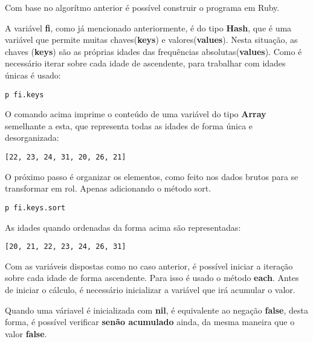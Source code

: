 \documentclass[12pt]{article}
\newcommand{\code}[1] {\textbf{#1}}
\begin{document}
Com base no algorítmo anterior é possível construir o programa em Ruby. 

 

A variável \code{fi}, como já mencionado anteriormente, é do tipo \code{Hash}, que é uma variável que permite muitas chaves(\code{keys}) e valores(\code{values}). Nesta situação, as chaves (\code{keys}) são as próprias idades das frequências absolutas(\code{values}). Como é necessário iterar sobre cada idade de ascendente, para trabalhar com idades únicas é usado:

\begin{lstlisting}[caption=Inspecionando apenas as idades das frequências absolutas]
  p fi.keys
\end{lstlisting}

O comando acima imprime o conteúdo de uma variável do tipo \code{Array} semelhante a esta, que representa todas as idades de forma única e desorganizada:

\begin{lstlisting}[caption=Idades das frequências absolutas podem ser usadas com o método de acesso]
[22, 23, 24, 31, 20, 26, 21]
\end{lstlisting}

O próximo passo é organizar os elementos, como feito nos dados brutos para se transformar em rol. Apenas adicionando o método sort.

\begin{lstlisting}[caption=Ordenando as idades das frequências absolutas com o método \code{sort}]
  p fi.keys.sort
\end{lstlisting}

As idades quando ordenadas da forma acima são representadas:

\begin{lstlisting}[caption=Idades das frequências absolutas ordenadas pelo método \code{sort}]
[20, 21, 22, 23, 24, 26, 31]
\end{lstlisting}

Com as variáveis dispostas como no caso anterior, é possível iniciar a iteração sobre cada idade de forma ascendente. Para isso é usado o método \code{each}. Antes de iniciar o cálculo, é necessário inicializar a variável que irá acumular o valor.


Quando uma váriavel é inicializada com \code{nil}, é equivalente ao negação \code{false}, desta forma, é possível verificar \textbf{senão acumulado} ainda, da mesma maneira que o valor \code{false}.
\end{document}
